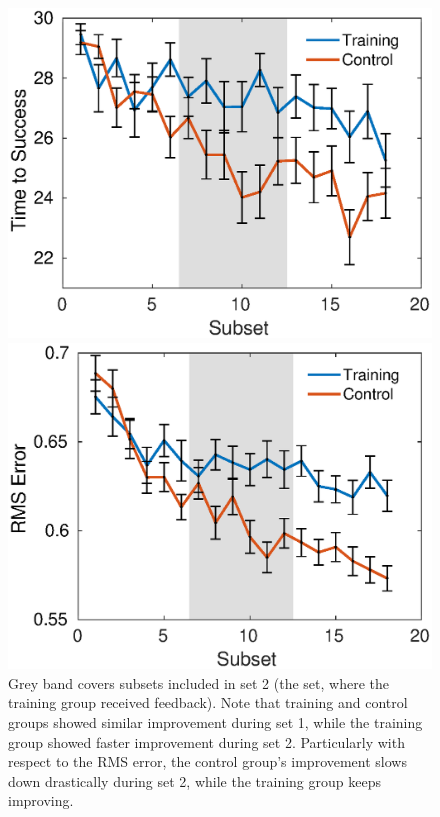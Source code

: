 

\begin{figure}[!h]
	\begin{center} 
	\begin{multicols}{2}
		\includegraphics[width=0.85\columnwidth]{tts_plateau.eps}
		\caption*{}
		\includegraphics[width=0.9\columnwidth]{err_plateau.eps}
		\caption*{}
	\end{multicols}
	\end{center}
	\vspace{-1.2cm}
	\caption{Grey band covers subsets included in set 2 (the set, where the training group received feedback). Note that training and control groups showed similar improvement during set 1, while the training group showed faster improvement during set 2. Particularly with respect to the RMS error, the control group's improvement slows down drastically during set 2, while the training group keeps improving.}
	\label{fig: plateau}
\end{figure}


